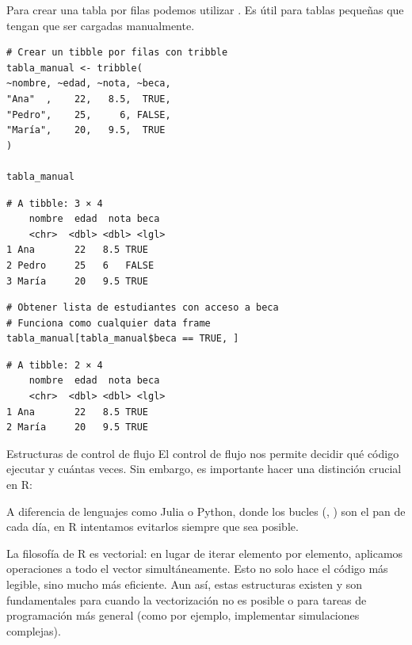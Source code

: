 \documentclass[8pt]{beamer}
\begin{document}
\begin{frame}[fragile]
	Para crear una tabla por filas podemos utilizar . Es \'util para tablas pequeñas que tengan que ser cargadas manualmente.
\begin{lstlisting}[style=RScript]
	# Crear un tibble por filas con tribble
tabla_manual <- tribble(
~nombre, ~edad, ~nota, ~beca,
"Ana"  ,    22,   8.5,  TRUE,
"Pedro",    25,     6, FALSE,
"María",    20,   9.5,  TRUE
)

tabla_manual
\end{lstlisting}
\begin{lstlisting}[style=RConsole]
# A tibble: 3 × 4
	nombre  edad  nota beca 
	<chr>  <dbl> <dbl> <lgl>
1 Ana       22   8.5 TRUE 
2 Pedro     25   6   FALSE
3 María     20   9.5 TRUE 
\end{lstlisting}
\begin{lstlisting}[style=RScript]
# Obtener lista de estudiantes con acceso a beca
# Funciona como cualquier data frame
tabla_manual[tabla_manual$beca == TRUE, ]	
\end{lstlisting}
\begin{lstlisting}[style=RConsole]
# A tibble: 2 × 4
	nombre  edad  nota beca 
	<chr>  <dbl> <dbl> <lgl>
1 Ana       22   8.5 TRUE 
2 María     20   9.5 TRUE 
\end{lstlisting}
\end{frame}




\begin{frame}[fragile]{Estructuras de control de flujo}
	El control de flujo nos permite decidir qué código ejecutar y cuántas veces. Sin embargo, es importante hacer una distinción crucial en R:

	\begin{alertblock}{}
		A diferencia de lenguajes como Julia o Python, donde los bucles (, ) son el pan de cada día, en R intentamos evitarlos siempre que sea posible.
	\end{alertblock}
	
	La filosofía de R es vectorial: en lugar de iterar elemento por elemento, aplicamos operaciones a todo el vector simultáneamente. Esto no solo hace el código más legible, sino mucho más eficiente. Aun así, estas estructuras existen y son fundamentales para cuando la vectorización no es posible o para tareas de programación más general (como por ejemplo, implementar simulaciones complejas).
\end{frame}
\end{document}
